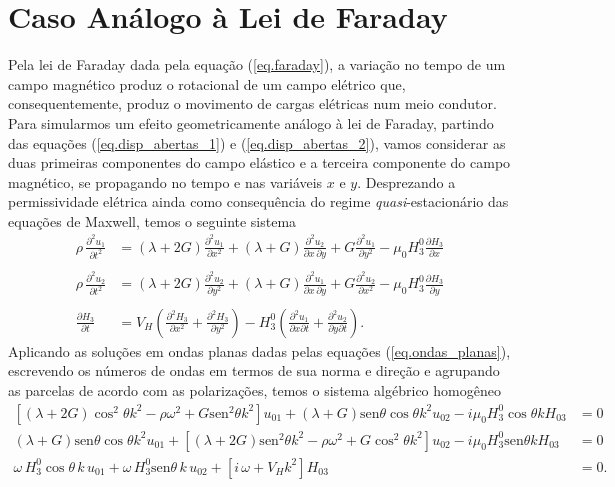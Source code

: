 \section{Caso An\'alogo \`a Lei de Faraday}\label{sec.faraday}

Pela lei de Faraday dada pela equa\c{c}\~ao (\ref{eq.faraday}), a varia\c{c}\~ao no tempo de um campo magn\'etico produz o rotacional de um campo el\'etrico que, consequentemente, produz o movimento de cargas el\'etricas num meio condutor. Para simularmos um efeito geometricamente an\'alogo \`a lei de Faraday, partindo das equa\c{c}\~oes (\ref{eq.disp_abertas_1}) e (\ref{eq.disp_abertas_2}), vamos considerar as duas primeiras componentes do campo el\'astico e a terceira componente do campo magn\'etico, se propagando no tempo e nas vari\'aveis $x$ e $y$. Desprezando a permissividade el\'etrica ainda como consequ\^encia do regime \textit{quasi}-estacion\'ario das equa\c{c}\~oes de Maxwell, temos o seguinte sistema
\begin{align*}
\rho\,\frac{\partial^2u_1}{\partial t^2}&=(\lambda+2G)\frac{\partial^2u_1}{\partial x^2}+(\lambda+G)\frac{\partial^2u_2}{\partial x\,\partial y}+G\frac{\partial^2u_1}{\partial y^2}-\mu_0H^0_3\frac{\partial H_3}{\partial x}\\\\
\rho\,\frac{\partial^2u_2}{\partial t^2}&=(\lambda+2G)\frac{\partial^2u_2}{\partial y^2}+(\lambda+G)\frac{\partial^2u_1}{\partial x\,\partial y}+G\frac{\partial^2u_2}{\partial x^2}-\mu_0H^0_3\frac{\partial H_3}{\partial y}\\\\
\frac{\partial H_3}{\partial t}&=V_H\left(\frac{\partial^2 H_3}{\partial x^2} +  \frac{\partial^2 H_3}{\partial y^2}\right) - H^0_3 \left(\frac{\partial^2 u_1}{\partial x \partial t} + \frac{\partial^2 u_2}{\partial y \partial t}\right).
\end{align*}
Aplicando as solu\c{c}\~oes em ondas planas dadas pelas equa\c{c}\~oes (\ref{eq.ondas_planas}), escrevendo os n\'umeros de ondas em termos de sua norma e dire\c{c}\~ao e agrupando as parcelas de acordo com as polariza\c{c}\~oes, temos o sistema alg\'ebrico homog\^eneo
\begin{align*}
\left[(\lambda+2G)\cos^2\theta k^2-\rho\omega^2+G\text{sen}^2\theta k^2\right]u_{01}+(\lambda+G)\text{sen}\theta\cos\theta k^2u_{02}-i\mu_0H^0_3\cos\theta kH_{03}&=0\\
(\lambda+G)\text{sen}\theta\cos\theta k^2u_{01}+\left[(\lambda+2G)\text{sen}^2\theta k^2-\rho\omega^2+G\cos^2\theta k^2\right]u_{02}-i\mu_0H^0_3\text{sen}\theta kH_{03}&=0\\
\omega\,H^0_3\cos\theta\,k\,u_{01}+\omega\,H^0_3\text{sen}\theta\,k\,u_{02}+\left[i\,\omega+V_Hk^2\right]H_{03}&=0.
\end{align*}
